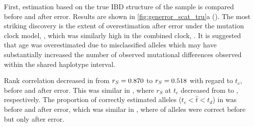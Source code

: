 %

%

First, estimation based on the true IBD structure of the sample is compared before and after error.
Results are shown in \cref{fig:generror_scat_tru}{a} ().
The most striking discovery is the extent of overestimation after error under the mutation clock model, \ClockM, which was similarly high in the combined clock, \ClockC.
It is suggested that age was overestimated due to misclassified alleles which may have substantially increased the number of observed mutational differences observed within the shared haplotype interval.

Rank correlation decreased in \ClockM from ${r_S = \dec{0.869553}}$ to ${r_S = \dec{0.517705}}$ with regard to $t_c$, before and after error.
This was similar in \ClockC, where $r_S$ at $t_c$ decreased from  to , respectively.
The proportion of correctly estimated alleles (${t_c < \hat{t} < t_d}$) in \ClockM was  before and
 after error, which was similar in \ClockC, where
 of alleles were correct before but only
 after error.

